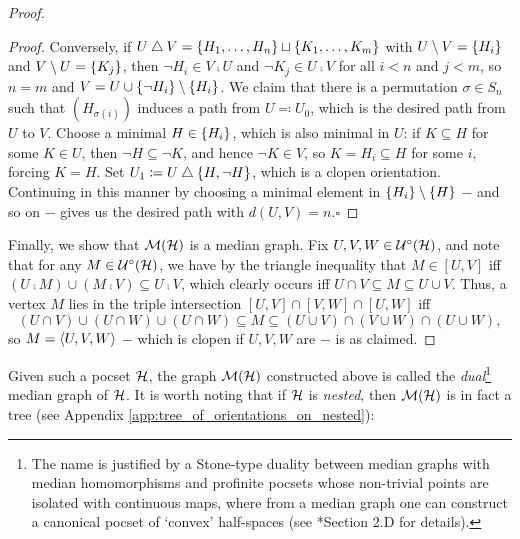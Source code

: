 \documentclass{amsart}
\begin{document}
\begin{proof}
\begin{center}
\begin{minipage}{0.95\textwidth}
\begin{proof}
                    \hspace{0.2in}Conversely, if $U\bigtriangleup V=\left\{H_1,\dots,H_n\right\}\sqcup\left\{K_1,\dots,K_m\right\}$ with $U\setminus V=\left\{H_i\right\}$ and $V\setminus U=\left\{K_j\right\}$, then $\lnot H_i\in V\comp U$ and $\lnot K_j\in U\comp V$ for all $i<n$ and $j<m$, so $n=m$ and $V=U\cup\left\{\lnot H_i\right\}\setminus\left\{H_i\right\}$. We claim that there is a permutation $\sigma\in S_n$ such that $(H_{\sigma(i)})$ induces a path from $U\eqqcolon U_0$, which is the desired path from $U$ to $V$. Choose a minimal $H\in\left\{H_i\right\}$, which is also minimal in $U$: if $K\subseteq H$ for some $K\in U$, then $\lnot H\subseteq\lnot K$, and hence $\lnot K\in V$, so $K=H_i\subseteq H$ for some $i$, forcing $K=H$. Set $U_1\coloneqq U\bigtriangleup\left\{H,\lnot H\right\}$, which is a clopen orientation. Continuing in this manner by choosing a minimal element in $\left\{H_i\right\}\setminus\left\{H\right\}$ $-$ and so on $-$ gives us the desired path with $d(U,V)=n$.\phantom\qedhere\hfill$\square$
                \end{proof}
            \end{minipage}
        \end{center}
        Finally, we show that $\mathcal{M}(\mathcal{H})$ is a median graph. Fix $U,V,W\in\mathcal{U}^\circ(\mathcal{H})$, and note that for any $M\in\mathcal{U}^\circ(\mathcal{H})$, we have by the triangle inequality that $M\in[U,V]$ iff $(U\comp M)\cup(M\comp V)\subseteq U\comp V$, which clearly occurs iff $U\cap V\subseteq M\subseteq U\cup V$. Thus, a vertex $M$ lies in the triple intersection $[U,V]\cap[V,W]\cap[U,W]$ iff
        \begin{equation*}
            (U\cap V)\cup(U\cap W)\cup(U\cap W)\subseteq M\subseteq(U\cup V)\cap(V\cup W)\cap(U\cup W),
        \end{equation*}
        so $M=\left\langle U,V,W\right\rangle$ $-$ which is clopen if $U,V,W$ are $-$ is as claimed.
    \end{proof}

    Given such a pocset $\mathcal{H}$, the graph $\mathcal{M}(\mathcal{H})$ constructed above is called the \textit{dual}\footnote{The name is justified by a Stone-type duality between median graphs with median homomorphisms and profinite pocsets whose non-trivial points are isolated with continuous maps, where from a median graph one can construct a canonical pocset of `convex' half-spaces (see \cite{CPTT23}*{Section 2.D} for details).} median graph of $\mathcal{H}$. It is worth noting that if $\mathcal{H}$ is \textit{nested}, then $\mathcal{M}(\mathcal{H})$ is in fact a tree (see Appendix \ref{app:tree_of_orientations_on_nested}):
\end{document}
